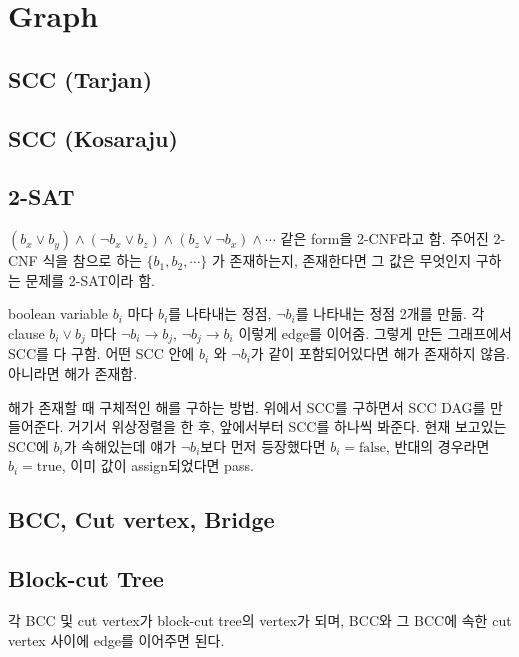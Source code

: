 \documentclass[10pt,landscape,a4paper,twocolumn]{article}
\begin{document}
\section{Graph}

\subsection{SCC (Tarjan)}


\subsection{SCC (Kosaraju)}


\subsection{2-SAT}

$(b_{x} \lor b_{y}) \land (\neg b_{x} \lor b_{z}) \land (b_{z} \lor \neg b_{x}) \land \cdots$ 같은 form을 2-CNF라고 함. 주어진 2-CNF 식을 참으로 하는 $\{ b_1, b_2, \cdots \}$ 가 존재하는지, 존재한다면 그 값은 무엇인지 구하는 문제를 2-SAT이라 함.

boolean variable $b_{i}$ 마다 $b_{i}$를 나타내는 정점, $\neg b_{i} $를 나타내는 정점 2개를 만듦. 각 clause $b_{i} \lor b_{j}$ 마다 $\neg b_{i} \to b_{j}$, $\neg b_{j} \to b_{i}$ 이렇게 edge를 이어줌. 그렇게 만든 그래프에서 SCC를 다 구함. 어떤 SCC 안에 $b_{i}$ 와 $\neg b_{i}$가 같이 포함되어있다면 해가 존재하지 않음. 아니라면 해가 존재함.

해가 존재할 때 구체적인 해를 구하는 방법. 위에서 SCC를 구하면서 SCC DAG를 만들어준다. 거기서 위상정렬을 한 후, 앞에서부터 SCC를 하나씩 봐준다. 현재 보고있는 SCC에 $b_{i}$가 속해있는데 얘가 $\neg b_{i}$보다 먼저 등장했다면 $b_{i} = \mathrm{false}$, 반대의 경우라면 $b_{i} = \mathrm{true}$, 이미 값이 assign되었다면 pass.

\subsection{BCC, Cut vertex, Bridge}


\subsection{Block-cut Tree}

각 BCC 및 cut vertex가 block-cut tree의 vertex가 되며, BCC와 그 BCC에 속한 cut vertex 사이에 edge를 이어주면 된다.
\end{document}
